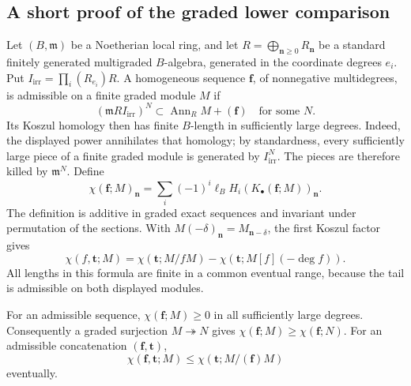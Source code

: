 \subsection{A short proof of the graded lower comparison}
\label{subsec:selmer-koszul-comparison}

Let $(B,\mathfrak m)$ be a Noetherian local ring, and let
$R=\bigoplus_{\boldsymbol n\ge0}R_{\boldsymbol n}$ be a standard finitely
generated multigraded $B$-algebra, generated in the coordinate degrees $e_i$.
Put $I_{\mathrm{irr}}=\prod_i(R_{e_i})R$.
A homogeneous sequence $\boldsymbol f$, of nonnegative multidegrees,
is admissible on a finite graded module $M$ if
\begin{equation}
 (\mathfrak m R I_{\mathrm{irr}})^N
 \subset\operatorname{Ann}_R M+(\boldsymbol f)
 \quad\text{for some }N.
 \label{eq:selmer-koszul-admissible}
\end{equation}
Its Koszul homology then has finite $B$-length in sufficiently large
degrees. Indeed, the displayed power annihilates that homology; by
standardness, every sufficiently large piece of a finite graded module
is generated by $I_{\mathrm{irr}}^N$. The pieces are therefore killed
by $\mathfrak m^N$. Define
\[
 \chi(\boldsymbol f;M)_{\boldsymbol n}
 =\sum_i(-1)^i\ell_B H_i(K_\bullet(\boldsymbol f;M))_{\boldsymbol n}.
\]
The definition is additive in graded exact sequences and invariant under
permutation of the sections. With $M(-\delta)_{\boldsymbol n}
=M_{\boldsymbol n-\delta}$, the first Koszul factor gives
\begin{equation}
 \chi(f,\boldsymbol t;M)
 =\chi(\boldsymbol t;M/fM)
  -\chi(\boldsymbol t;M[f](-\deg f)).
 \label{eq:selmer-koszul-recursion}
\end{equation}
All lengths in this formula are finite in a common eventual range,
because the tail is admissible on both displayed modules.

\begin{proposition}
\label{prop:selmer-koszul-positive}
For an admissible sequence, $\chi(\boldsymbol f;M)\ge0$ in all sufficiently
large degrees. Consequently a graded surjection $M\twoheadrightarrow N$
gives $\chi(\boldsymbol f;M)\ge\chi(\boldsymbol f;N)$.
For an admissible concatenation $(\boldsymbol f,\boldsymbol t)$,
\[
 \chi(\boldsymbol f,\boldsymbol t;M)
 \le\chi(\boldsymbol t;M/(\boldsymbol f)M)
\]
eventually.
\end{proposition}

